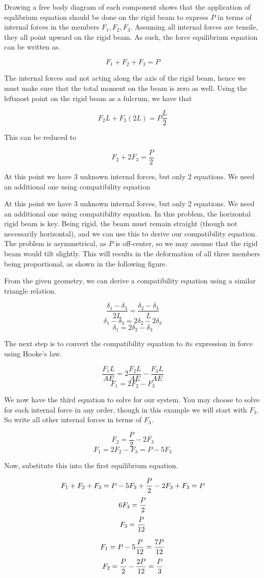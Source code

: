 \documentclass[
10pt,
a4paper,
openany,
svgnames,
]{book} %
\begin{document}
\begin{solution}

  Drawing a free body diagram of each component shows that the application of equlibrium equation should be done on the rigid beam to express $P$ in terms of internal forces in the members $F_1, F_2, F_3$. Assuming all internal forces are tensile, they all point upward on the rigid beam. As such, the force equilibrium equation can be written as.

 \[ F_1 + F_2 + F_3 = P \]

 The internal forces and not acting along the axis of the rigid beam, hence we must make sure that the total moment on the beam is zero as well. Using the leftmost point on the rigid beam as a fulcrum, we have that

 $$ F_2 L + F_3 (2L) = P \frac{L}{2} $$

 This can be reduced to 

 $$ F_2 + 2F_3 = \frac{P}{2} $$

 At this point we have 3 unknown internal forces, but only 2 equations. We need an additional one using compatibility equation

 At this point we have 3 unknown internal forces, but only 2 equations. We need an additional one using compatibility equation. In this problem, the horizontal rigid beam is key. Being rigid, the beam must remain straight (though not necessarily horizontal), and we can use this to derive our compatibility equation. The problem is asymmetrical, as $P$ is off-center, so we may assume that the rigid beam would tilt slightly. This will results in the deformation of all three members being proportional, as shown in the following figure.


 From the given geometry, we can derive a compatibility equation using a similar triangle relation.

 $$ \frac{\delta_1 - \delta_3}{2L} = \frac{\delta_2 - \delta_3}{L} $$
 $$ \delta_1 - \delta_3 = 2\delta_2 - 2\delta_3 $$
 $$ \delta_1 = 2\delta_2 - \delta_3 $$

 The next step is to convert the compatibility equation to its expression in force using Hooke's law.

 $$ \frac{F_1 L}{AE} = 2\frac{F_2 L}{AE} - \frac{F_3 L}{AE} $$
 $$ F_1 = 2F_2 - F_3 $$

 We now have the third equation to solve for our system. You may choose to solve for each internal force in any order, though in this example we will start with $F_3$. So write all other internal forces in terms of $F_3$.

 $$ F_2 = \frac{P}{2} - 2F_3 $$
 $$ F_1 = 2F_2 - F_3 = P - 5F_3 $$

 Now, substitute this into the first equilibrium equation.

 $$ F_1 + F_2 + F_3 = P - 5F_3 + {P \over 2} - 2F_3 + F_3 = P $$
 $$ 6F_3 = {P \over 2} $$
 $$ F_3 = {P \over 12} $$

 $$ F_1 = P - 5 {P \over 12} = {7P \over 12} $$
 $$ F_2 = {P \over 2} - {2P \over 12} = {P \over 3} $$
\end{solution}
\end{document}
